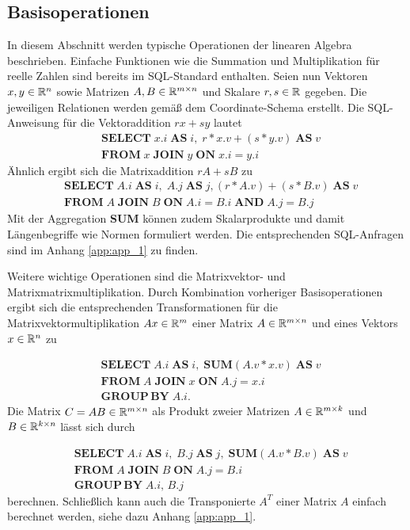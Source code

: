 \subsection*{Basisoperationen}
\label{abs_basisoperationen}
In diesem Abschnitt werden typische Operationen der linearen Algebra beschrieben. Einfache Funktionen wie die Summation und Multiplikation für reelle Zahlen sind bereits im SQL-Standard \cite{DBLP:books/daglib/0067064} enthalten. Seien nun Vektoren $x,y \in \mathbb{R}^n$ sowie Matrizen $A,B \in \mathbb{R}^{m \times n}$ und Skalare $r,s \in \mathbb{R}$ gegeben. Die jeweiligen Relationen werden gemäß dem Coordinate-Schema erstellt. Die SQL-Anweisung für die Vektoraddition $rx+sy$ lautet
\begin{align*}
    & \mathbf{SELECT} \; x.i \; \mathbf{AS} \; i, \; r*x.v+(s*y.v ) \; \mathbf{AS} \; v \\
    & \mathbf{FROM} \; x \; \mathbf{JOIN} \; y \; \mathbf{ON} \; x.i=y.i
\end{align*}
Ähnlich ergibt sich die Matrixaddition $rA+sB$ zu
\begin{align*}
    & \mathbf{SELECT} \; A.i \; \mathbf{AS} \; i, \; A.j \; \mathbf{AS} \; j, (r*A.v)+(s*B.v ) \; \mathbf{AS} \; v \\
    & \mathbf{FROM} \; A \; \mathbf{JOIN} \; B \; \mathbf{ON} \; A.i=B.i \; \mathbf{AND} \; A.j=B.j
\end{align*} 
Mit der Aggregation \textbf{SUM} können zudem Skalarprodukte und damit Längenbegriffe wie Normen formuliert werden. Die entsprechenden SQL-Anfragen sind im Anhang \ref{app:app_1} zu finden. 

Weitere wichtige Operationen sind die Matrixvektor- und Matrixmatrixmultiplikation. 
Durch Kombination vorheriger Basisoperationen ergibt sich die entsprechenden Transformationen für die Matrixvektormultiplikation $Ax \in \mathbb{R}^m$ einer Matrix $A \in \mathbb{R}^{m \times n}$ und eines Vektors $x \in \mathbb{R}^n$ zu

\begin{align*}
    & \mathbf{SELECT} \; A.i \; \mathbf{AS} \; i, \; \mathbf{SUM} (A.v*x.v) \; \mathbf{AS} \; v\\
    & \mathbf{FROM} \; A \; \mathbf{JOIN} \; x \; \mathbf{ON} \; A.j=x.i \; \\
    & \mathbf{GROUP} \, \mathbf{BY} \; A.i.
\end{align*}
Die Matrix $C=AB \in \mathbb{R}^{m \times n}$ als Produkt zweier Matrizen $A \in \mathbb{R}^{m \times k}$ und $B \in \mathbb{R}^{k \times n}$ lässt sich durch

\begin{align*}
    & \mathbf{SELECT} \; A.i \; \mathbf{AS} \; i, \; B.j \; \mathbf{AS} \; j, \; \mathbf{SUM} (A.v*B.v) \; \mathbf{AS} \; v\\
    & \mathbf{FROM} \; A \; \mathbf{JOIN} \; B \; \mathbf{ON} \; A.j=B.i \; \\
    & \mathbf{GROUP} \, \mathbf{BY} \; A.i, \, B.j
\end{align*}
berechnen.
Schließlich kann auch die Transponierte $A^T$ einer Matrix $A$ einfach berechnet werden, siehe dazu Anhang \ref{app:app_1}.

